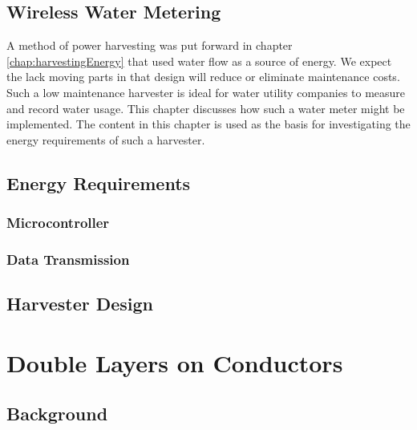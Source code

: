     

  \chapter{Wireless Water Metering}
    \label{chap:wirelessWaterMetering}

    A method of power harvesting was put forward in chapter \ref{chap:harvestingEnergy} that used water flow as a source of energy.
    We expect the lack moving parts in that design will reduce or eliminate maintenance costs.
    Such a low maintenance harvester is ideal for water utility companies to measure and record water usage.
    This chapter discusses how such a water meter might be implemented.
    The content in this chapter is used as the basis for investigating the energy requirements of such a harvester.

    

  \chapter{Energy Requirements}
    \label{chap:energyRequirements}
    
    \section{Microcontroller}
        
    
    \section{Data Transmission}
        

  \chapter{Harvester Design}
    \label{chap:harvesterDesign}
    

\part{\label{part:doubleLayersOnConductors}Double Layers on Conductors}
  \chapter{Background}
